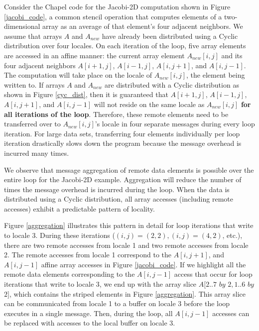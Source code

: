 Consider the Chapel code for the Jacobi-2D computation shown in Figure \ref{jacobi_code}, a common stencil operation that computes elements of a two-dimensional array as an average of that element's four adjacent neighbors. We assume that arrays $A$ and $A_{new}$ have already been distributed using a Cyclic distribution over four locales. On each iteration of the loop, five array elements are accessed in an affine manner: the current array element $A_{new}[i, j]$ and its four adjacent neighbors $A[i+1, j]$, $A[i-1, j]$, $A[i, j+1]$, and $A[i, j-1]$. The computation will take place on the locale of $A_{new}[i, j]$, the element being written to. If arrays $A$ and $A_{new}$ are distributed with a Cyclic distribution as shown in Figure \ref{cyc_dist}, then it is guaranteed that $A[i+1, j]$, $A[i-1, j]$, $A[i, j+1]$, and $A[i, j-1]$ will not reside on the same locale as $A_{new}[i, j]$ \textbf{for all iterations of the loop}. Therefore, these remote elements need to be transferred over to $A_{new}[i, j]$'s locale in four separate messages during every loop iteration. For large data sets, transferring four elements individually per loop iteration drastically slows down the program because the message overhead is incurred many times. 

We observe that message aggregation of remote data elements is possible over the entire loop for the Jacobi-2D example. Aggregation will reduce the number of times the message overhead is incurred during the loop. When the data is distributed using a Cyclic distribution, all array accesses (including remote accesses) exhibit a predictable pattern of locality. 

Figure \ref{aggregation} illustrates this pattern in detail for loop iterations that write to locale 3. During these iterations ($(i, j) = (2, 2), (i, j) = (4, 2)$, etc.), there are two remote accesses from locale 1 and two remote accesses from locale 2. The remote accesses from locale 1 correspond to the $A[i, j+1]$, and $A[i, j-1]$ affine array accesses in Figure \ref{jacobi_code}. If we highlight all the remote data elements corresponding to the $A[i, j-1]$ access that occur for loop iterations that write to locale 3, we end up with the array slice $A[2..7$ $by$ $2, 1..6$ $by$ $2]$, which contains the striped elements in Figure \ref{aggregation}. This array slice can be communicated from locale 1 to a buffer on locale 3 before the loop executes in a single message. Then, during the loop, all $A[i, j-1]$ accesses can be replaced with accesses to the local buffer on locale 3. 

